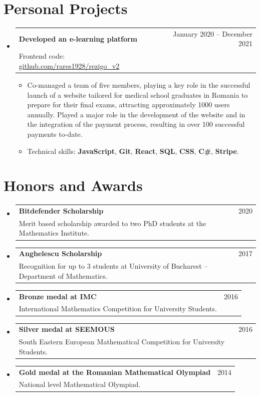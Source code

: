 \documentclass[a4paper, 11pt]{article}
\makeatletter
\newcommand{\CVItem}[1]{
  \item{
    {#1 \vspace{-2pt}}
  }
}
\newcommand{\CVSubheading}[4]{
  \vspace{-2pt}\item
    \begin{tabular*}{0.97\textwidth}[t]{l@{\extracolsep{\fill}}r}
      \textbf{#1} & #2 \\
      #3 & \ #4 \\
    \end{tabular*}\vspace{-7pt}
}
\newcommand{\CVSubHeadingListStart}{\begin{itemize}[leftmargin=0.5cm, label={}]}
\newcommand{\CVSubHeadingListEnd}{\end{itemize}}
\newcommand{\CVItemListStart}{\begin{itemize}}
\newcommand{\CVItemListEnd}{\end{itemize}\vspace{-5pt}}
\makeatother
\begin{document}
\section{Personal Projects}
  \CVSubHeadingListStart
    \CVSubheading
      {Developed an e-learning platform}{January 2020 -- December 2021}
		{Frontend code: \href{https://github.com/rares1928/rezigo_v2}{github.com/rares1928/rezigo\_v2}}{}
      \CVItemListStart
      \CVItem{Co-managed a team of five members, playing a key role in the successful launch of a website tailored for medical school graduates in Romania to prepare for their final exams, attracting approximately 1000 users annually. Played a major role in the development of the website and in the integration of the payment process, resulting in over 100 successful payments to-date.}
      \CVItem{Technical skills: \textbf{JavaScript}, \textbf{Git}, \textbf{React}, \textbf{SQL}, \textbf{CSS}, \textbf{C\#}, \textbf{Stripe}.}
      \CVItemListEnd
  \CVSubHeadingListEnd


\section{Honors and Awards}
  \CVSubHeadingListStart
    \CVSubheading
      {Bitdefender Scholarship}{2020}
      {Merit based scholarship awarded to two PhD students at the Mathematics Institute.}{}
      \CVSubheading
      {Anghelescu Scholarship}{2017}
      {Recognition for up to 3 students at University of Bucharest -- Department of Mathematics.}{}
      \CVSubheading
      {Bronze medal at IMC}{2016}
      {International Mathematics Competition
for University Students.}{}
    \CVSubheading
      {Silver medal at SEEMOUS}{2016}
      {South Eastern European Mathematical Competition for University Students.}{}
    \CVSubheading
      {Gold medal at the Romanian Mathematical Olympiad}{2014}
      {National level Mathematical Olympiad.}{}

  \CVSubHeadingListEnd

\end{document}

